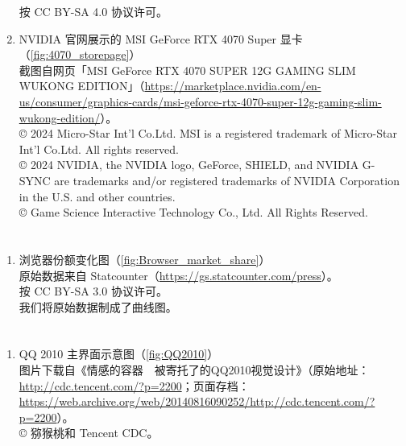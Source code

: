 \begin{enumerate}
    按 CC BY-SA 4.0 协议许可。
  \item NVIDIA 官网展示的 MSI GeForce RTX 4070 Super 显卡（\autoref{fig:4070_storepage}）\\
    截图自网页「MSI GeForce RTX 4070 SUPER 12G GAMING SLIM WUKONG EDITION」（\url{https://marketplace.nvidia.com/en-us/consumer/graphics-cards/msi-geforce-rtx-4070-super-12g-gaming-slim-wukong-edition/}）。\\
    © 2024 Micro-Star Int'l Co.Ltd. MSI is a registered trademark of Micro-Star Int'l Co.Ltd. All rights reserved.\\
    © 2024 NVIDIA, the NVIDIA logo, GeForce, SHIELD, and NVIDIA G-SYNC are trademarks and/or registered trademarks of NVIDIA Corporation in the U.S. and other countries.\\
    © Game Science Interactive Technology Co., Ltd. All Rights Reserved.
\end{enumerate}

\section{}

\begin{enumerate}
  \item 浏览器份额变化图（\autoref{fig:Browser_market_share}）\\
  原始数据来自 Statcounter（\url{https://gs.statcounter.com/press}）。\\
  按 CC BY-SA 3.0 协议许可。\\
  我们将原始数据制成了曲线图。
\end{enumerate}

\section{}

\begin{enumerate}
  \item QQ 2010 主界面示意图（\autoref{fig:QQ2010}）\\
    图片下载自《情感的容器　被寄托了的QQ2010视觉设计》（原始地址：\url{http://cdc.tencent.com/?p=2200}；页面存档：\url{https://web.archive.org/web/20140816090252/http://cdc.tencent.com/?p=2200}）。\\
    © 猕猴桃和 Tencent CDC。
\end{enumerate}

\section{}


